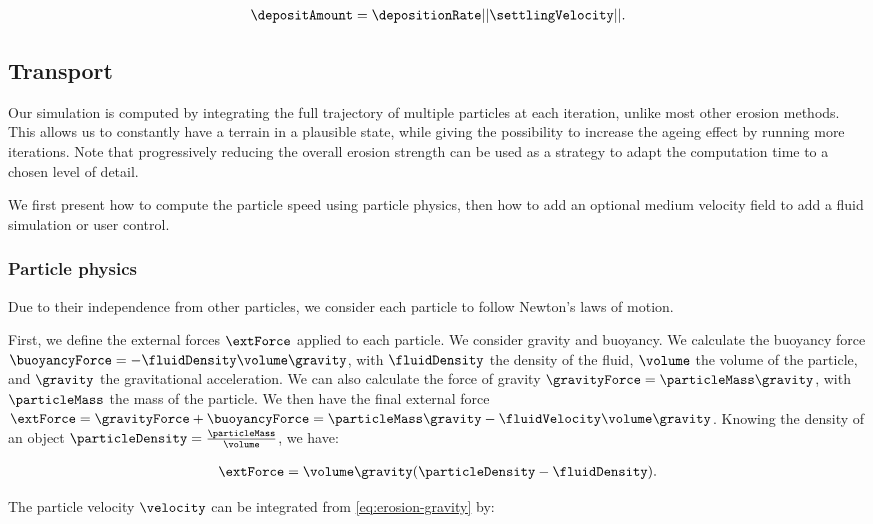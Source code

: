 \begin{align}
    \label{eq:erosion-deltaDepositon}
    \depositAmount = \depositionRate ||\settlingVelocity||.
\end{align}

\subsection{Transport}
Our simulation is computed by integrating the full trajectory of multiple particles at each iteration, unlike most other erosion methods. This allows us to constantly have a terrain in a plausible state, while giving the possibility to increase the ageing effect by running more iterations. 
Note that progressively reducing the overall erosion strength can be used as a strategy to adapt the computation time to a chosen level of detail.

We first present how to compute the particle speed using particle physics, then how to add an optional medium velocity field to add a fluid simulation or user control.

\subsubsection{Particle physics}
Due to their independence from other particles, we consider each particle to follow Newton's laws of motion.

First, we define the external forces $\extForce$ applied to each particle. We consider gravity and buoyancy.
We calculate the buoyancy force $\buoyancyForce = -\fluidDensity \volume \gravity$, with $\fluidDensity$ the density of the fluid, $\volume$ the volume of the particle, and $\gravity$ the gravitational acceleration. We can also calculate the force of gravity $\gravityForce = \particleMass \gravity$, with $\particleMass$ the mass of the particle. We then have the final external force $\extForce = \gravityForce + \buoyancyForce = \particleMass \gravity - \fluidVelocity \volume \gravity$. Knowing the density of an object $\particleDensity = \frac{\particleMass}{\volume}$, we have:

\begin{align}
    \label{eq:erosion-gravity}
    \extForce = \volume \gravity (\particleDensity - \fluidDensity ).
\end{align}

The particle velocity $\velocity$ can be integrated from \eqref{eq:erosion-gravity} by: 

